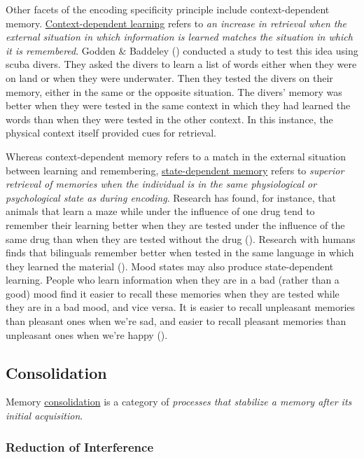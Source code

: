 \documentclass[
]{krantz}
\begin{document}
Other facets of the encoding specificity principle include context-dependent memory. \hyperref[context-dependent-learning]{Context-dependent learning} refers to \emph{an increase in retrieval when the external situation in which information is learned matches the situation in which it is remembered}. Godden \& Baddeley () conducted a study to test this idea using scuba divers. They asked the divers to learn a list of words either when they were on land or when they were underwater. Then they tested the divers on their memory, either in the same or the opposite situation. The divers' memory was better when they were tested in the same context in which they had learned the words than when they were tested in the other context. In this instance, the physical context itself provided cues for retrieval.

Whereas context-dependent memory refers to a match in the external situation between learning and remembering, \hyperref[state-dependent-memory]{state-dependent memory} refers to \emph{superior retrieval of memories when the individual is in the same physiological or psychological state as during encoding}. Research has found, for instance, that animals that learn a maze while under the influence of one drug tend to remember their learning better when they are tested under the influence of the same drug than when they are tested without the drug (). Research with humans finds that bilinguals remember better when tested in the same language in which they learned the material (). Mood states may also produce state-dependent learning. People who learn information when they are in a bad (rather than a good) mood find it easier to recall these memories when they are tested while they are in a bad mood, and vice versa. It is easier to recall unpleasant memories than pleasant ones when we're sad, and easier to recall pleasant memories than unpleasant ones when we're happy ().

\subsection*{Consolidation}\label{consolidation}


Memory \hyperref[consolidation]{consolidation} is a category of \emph{processes that stabilize a memory after its initial acquisition}.

\subsubsection*{Reduction of Interference}\label{reduction-of-interference}
\end{document}
